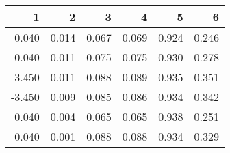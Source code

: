 \begin{table}[ht]
\centering
\begin{tabular}{rrrrrr}
  \hline
1 & 2 & 3 & 4 & 5 & 6 \\ 
  \hline
0.040 & 0.014 & 0.067 & 0.069 & 0.924 & 0.246 \\ 
  0.040 & 0.011 & 0.075 & 0.075 & 0.930 & 0.278 \\ 
  -3.450 & 0.011 & 0.088 & 0.089 & 0.935 & 0.351 \\ 
  -3.450 & 0.009 & 0.085 & 0.086 & 0.934 & 0.342 \\ 
  0.040 & 0.004 & 0.065 & 0.065 & 0.938 & 0.251 \\ 
  0.040 & 0.001 & 0.088 & 0.088 & 0.934 & 0.329 \\ 
   \hline
\end{tabular}
\end{table}
